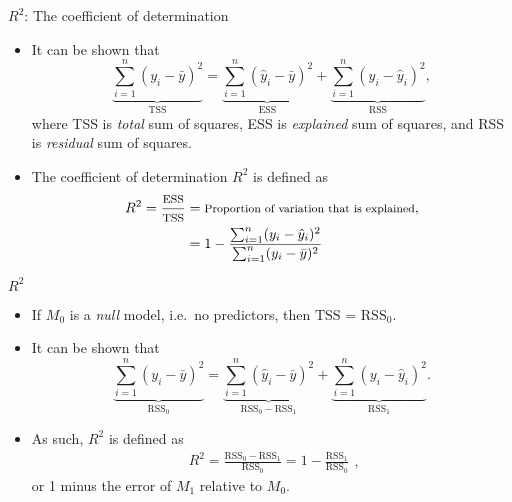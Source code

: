 \documentclass[
  10pt,
  ignorenonframetext,
]{beamer}
\begin{document}
\begin{frame}{\(R^2\): The coefficient of determination}
\protect\hypertarget{r2-the-coefficient-of-determination}{}
\begin{itemize}
\item
  It can be shown that
  \[\underbrace{\sum_{i=1}^n (y_i-\bar{y})^2}_{\text{TSS}} = \underbrace{\sum_{i=1}^n (\hat{y}_i - \bar{y})^2}_{\text{ESS}} + \underbrace{\sum_{i=1}^n (y_i - \hat{y}_i)^2}_{\text{RSS}},\]
  where TSS is \emph{total} sum of squares, ESS is \emph{explained} sum
  of squares, and RSS is \emph{residual} sum of squares.
\item
  The coefficient of determination \(R^2\) is defined as
  \[\begin{aligned}
  R^2 = \frac{\text{\footnotesize ESS}}{\text{\footnotesize TSS}} &= \text{\footnotesize Proportion of variation that is explained},\\
  &= 1 - \frac{\sum_{i=1}^n (y_i - \hat{y}_i)^2 }{\sum_{i=1}^n (y_i-\bar{y})^2 }\end{aligned}\]
\end{itemize}
\end{frame}

\begin{frame}{\(R^2\)}
\protect\hypertarget{r2-1}{}
\begin{itemize}
\item
  If \(M_0\) is a \emph{null} model, i.e.~no predictors, then
  \(\text{TSS}\) = \(\text{RSS}_0\).
\item
  It can be shown that
  \[\underbrace{\sum_{i=1}^n (y_i-\bar{y})^2}_{\text{RSS}_0} = \underbrace{\sum_{i=1}^n (\hat{y}_i - \bar{y})^2}_{\text{RSS}_0 - \text{RSS}_1} + \underbrace{\sum_{i=1}^n (y_i - \hat{y}_i)^2}_{\text{RSS}_1}.\]
\item
  As such, \(R^2\) is defined as \[\begin{aligned}
  R^2 = \frac{\text{RSS}_0-\text{RSS}_1}{\text{RSS}_0} = 1 - \frac{\text{RSS}_1}{\text{RSS}_0}
  \end{aligned},\] or 1 minus the error of \(M_1\) relative to \(M_0\).
\end{itemize}
\end{frame}
\end{document}
